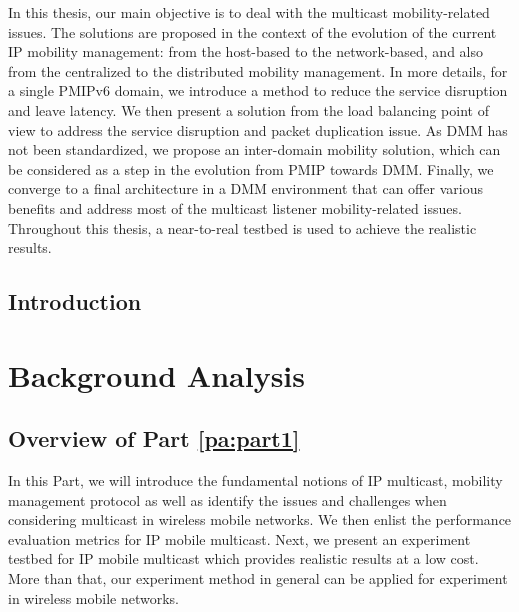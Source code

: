 \documentclass[a4paper,10pt,twoside]{ThesisStyle}
\begin{document}
In this thesis, our main objective is to deal with the multicast mobility-related issues. The solutions are proposed in the context of the evolution of the current IP mobility management: from the host-based to the network-based, and also from the centralized to the distributed mobility management. In more details, for a single PMIPv6 domain, we introduce a method to reduce the service disruption and leave latency. We then present a solution from the load balancing point of view to address the service disruption and packet duplication issue. As DMM has not been standardized, we propose an inter-domain mobility solution, which can be considered as a step in the evolution from PMIP towards DMM. Finally, we converge to a final architecture in a DMM environment that can offer various benefits and address most of the multicast listener mobility-related issues. Throughout this thesis, a near-to-real testbed is used to achieve the realistic results.

\clearpage



\tableofcontents
\clearpage

\listoffigures
\clearpage
{}
\listoftables
\clearpage

{}

\clearpage

\mainmatter
\chapter{Introduction}
\label{intro}

\part{Background Analysis\label{pa:part1}}

\chapter*{Overview of Part \ref{pa:part1}}
In this Part, we will introduce the fundamental notions of IP multicast, mobility management protocol as well as identify the issues and challenges when considering multicast in wireless mobile networks. We then enlist the performance evaluation metrics for IP mobile multicast. Next, we present an experiment testbed for IP mobile multicast which provides realistic results at a low cost. More than that, our experiment method in general can be applied for experiment in wireless mobile networks. \\
\end{document}
